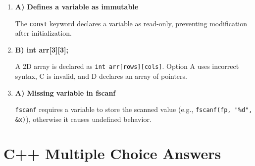 \documentclass[a4paper,12pt]{article}
\begin{document}
\begin{enumerate}
    \item \textbf{A) Defines a variable as immutable}

    The \verb|const| keyword declares a variable as read-only, preventing modification after initialization.

    \item \textbf{B) int arr[3][3];}

    A 2D array is declared as \verb|int arr[rows][cols]|. Option A uses incorrect syntax, C is invalid, and D declares an array of pointers.

    \item \textbf{A) Missing variable in fscanf}

    \verb|fscanf| requires a variable to store the scanned value (e.g., \verb|fscanf(fp, "%d", &x)|), otherwise it causes undefined behavior.
\end{enumerate}

\section{C++ Multiple Choice Answers}
\end{document}
